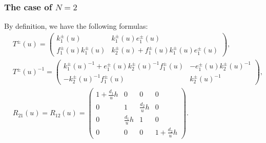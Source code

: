 \documentclass[a4paper,12pt]{article}
\numberwithin{equation}{section}
\begin{document}
\subsubsection{The case of $N=2$}
By definition, we have the following formulas:
\begin{align*}
&T^{ \pm}(u)=\left(\begin{array}{cc}
k_1^{ \pm}(u) & k_1^{ \pm}(u) e_1^{ \pm}(u) \\
f_1^{ \pm}(u) k_1^{ \pm}(u) & k_2^{ \pm}(u)+f_1^{ \pm}(u) k_1^{ \pm}(u) e_1^{ \pm}(u)
\end{array}\right),\\
&T^{\pm}(u)^{-1}=\left(\begin{array}{cc}
k_1^{\pm}(u)^{-1}+e_1^{\pm}(u) k_2^{\pm}(u)^{-1}f_1^{ \pm}(u) & -e_1^{\pm}(u)k_2^{ \pm}(u)^{-1} \\
-k_2^{\pm}(u)^{-1}f_1^{\pm}(u) & k_2^{\pm}(u)^{-1}
\end{array}\right),\\
&R_{21}(u)=R_{12}(u)=\left( {\begin{array}{*{20}{c}}
{1+\frac{d_{1}}{u}h} & 0 & 0 & 0 \\
0 & 1 & {\frac{d_{2}}{u}h} & 0 \\
0 & {\frac{d_{1}}{u}h} & 1 & 0 \\
0 & 0 & 0 & {1+\frac{d_{2}}{u}h}
\end{array}}\right).
\end{align*}
\end{document}

